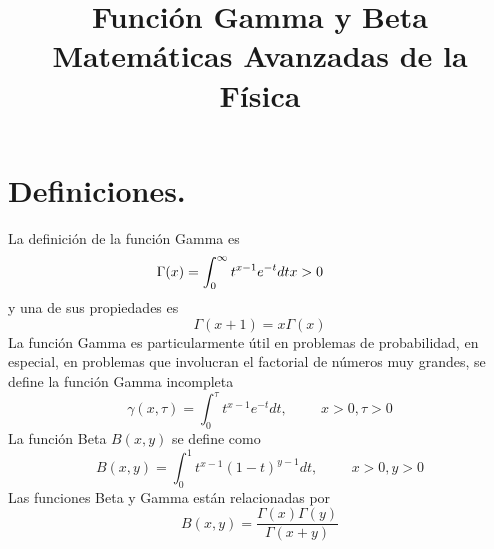 
\usepackage{mathrsfs}
\title{Función Gamma y Beta \\ {\large Matemáticas Avanzadas de la Física}}
\date{ }

\renewcommand\labelenumii{\theenumi.{\arabic{enumii}}}
\maketitle
\fontsize{14}{14}\selectfont
\section{Definiciones.}
La definición de la función Gamma es
\[ \Gamma(x) = \int_{0}^{\infty} t^{x-1}e^{-t} dt \hspace{1cm x > 0} \]
y una de sus propiedades es
\[ \Gamma(x+1) = x \Gamma(x) \]
La función Gamma es particularmente útil en problemas de probabilidad, en especial, en problemas que involucran el factorial de números muy grandes, se define la función Gamma incompleta
\[ \gamma(x, \tau ) = \int_{0}^{\tau} t^{x-1}e^{-t} dt, \hspace{1cm} x>0, \tau >0  \]
La función Beta $B(x,y)$ se define como
\[ B(x,y) = \int_{0}^{1} t^{x-1} (1-t)^{y-1} dt, \hspace{1cm} x>0, y>0 \]
Las funciones Beta y Gamma están relacionadas por
\[ B(x,y) = \dfrac{\Gamma(x) \Gamma(y)}{\Gamma(x+y)} \]
